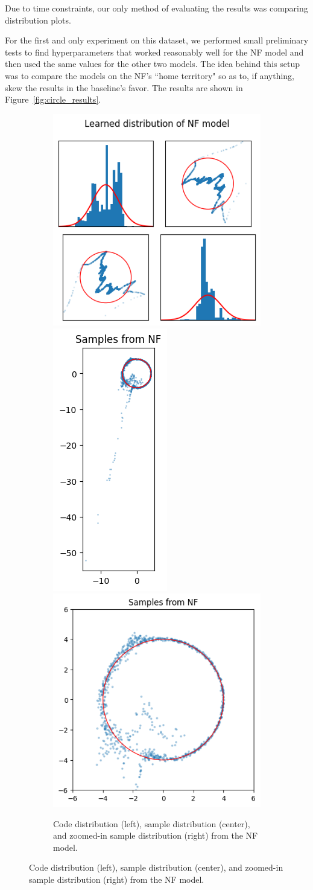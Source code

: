 Due to time constraints, our only method of evaluating the results was comparing distribution plots.

For the first and only experiment on this dataset, we performed small preliminary tests to find hyperparameters that worked reasonably well for the NF model and then used the same values for the other two models. The idea behind this setup was to compare the models on the NF's ``home territory" so as to, if anything, skew the results in the baseline's favor. The results are shown in Figure~\ref{fig:circle_results}.

\begin{figure}
\centering
\begin{subfigure}{\textwidth}
    \centering
    \includegraphics[height=.39\textwidth]{images/degen_circle/nf_code_distribution.png}
    \includegraphics[height=.39\textwidth]{images/degen_circle/nf_sample_full.png}
    \includegraphics[height=.39\textwidth]{images/degen_circle/nf_sample_zoomed.png}
    \caption{Code distribution (left), sample distribution (center), and zoomed-in sample distribution (right) from the NF model.}

\end{subfigure}
\end{figure}
